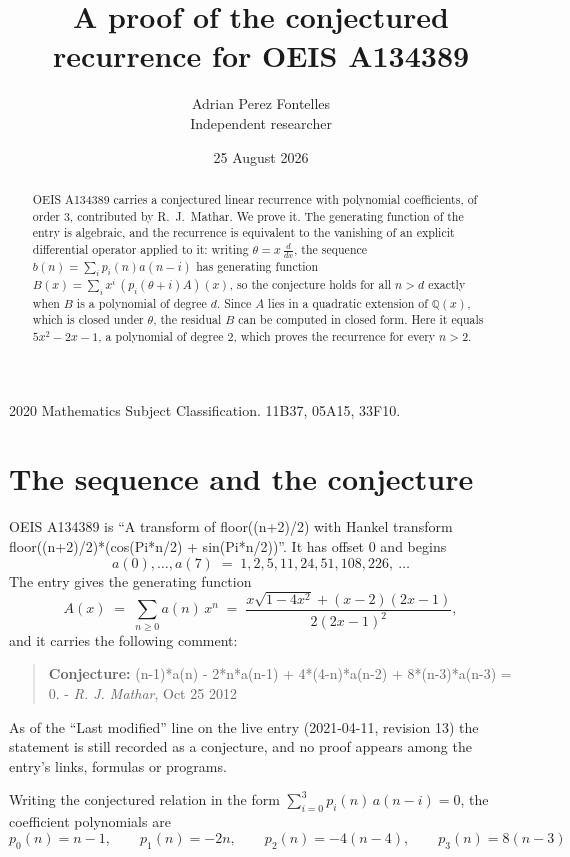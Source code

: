 \documentclass[11pt,a4paper]{article}
\title{A proof of the conjectured recurrence for OEIS A134389}
\author{Adrian Perez Fontelles\\ \small Independent researcher}
\date{25 August 2026}
\theoremstyle{plain}
\theoremstyle{definition}
\begin{document}
\maketitle

\begin{abstract}
OEIS A134389 carries a conjectured linear recurrence with polynomial coefficients, of
order 3, contributed by R.~J.~Mathar. We prove it. The generating function of the
entry is algebraic, and the recurrence is equivalent to the vanishing of an explicit
differential operator applied to it: writing $\theta=x\,\frac{d}{dx}$, the sequence
$b(n)=\sum_{i}p_{i}(n)a(n-i)$ has generating function
$B(x)=\sum_{i}x^{i}\,(p_{i}(\theta+i)A)(x)$, so the conjecture holds for all $n>d$ exactly
when $B$ is a polynomial of degree $d$. Since $A$ lies in a quadratic extension of
$\mathbb{Q}(x)$, which is closed under $\theta$, the residual $B$ can be computed in
closed form. Here it equals $5 x^{2} - 2 x - 1$, a polynomial of degree $2$, which proves
the recurrence for every $n>2$.
\end{abstract}

\noindent\small 2020 Mathematics Subject Classification. 11B37, 05A15, 33F10.\normalsize

\section{The sequence and the conjecture}

OEIS A134389 is ``A transform of floor((n+2)/2) with Hankel transform floor((n+2)/2)*(cos(Pi*n/2) + sin(Pi*n/2))''. It has offset $0$ and begins
\[
a(0),\dots,a(7)\;=\;1, 2, 5, 11, 24, 51, 108, 226,\ \dots
\]
The entry gives the generating function
\begin{equation}\label{eq:gf}
A(x)\;=\;\sum_{n\ge 0} a(n)\,x^{n}\;=\;\frac{x \sqrt{1 - 4 x^{2}} + \left(x - 2\right) \left(2 x - 1\right)}{2 \left(2 x - 1\right)^{2}} ,
\end{equation}
and it carries the following comment:
\begin{quote}\small
\textbf{Conjecture:} (n-1)*a(n) - 2*n*a(n-1) + 4*(4-n)*a(n-2) + 8*(n-3)*a(n-3) = 0. - \emph{R. J. Mathar}, Oct 25 2012
\end{quote}
As of the ``Last modified'' line on the live entry (2021-04-11, revision 13) the
statement is still recorded as a conjecture, and no proof appears among the entry's links,
formulas or programs.

Writing the conjectured relation in the form $\sum_{i=0}^{3}p_{i}(n)\,a(n-i)=0$,
the coefficient polynomials are
\[
p_{0}(n)=n - 1,\qquad p_{1}(n)=- 2 n,\qquad p_{2}(n)=- 4 \left(n - 4\right),\qquad p_{3}(n)=8 \left(n - 3\right)
\]
\end{document}
